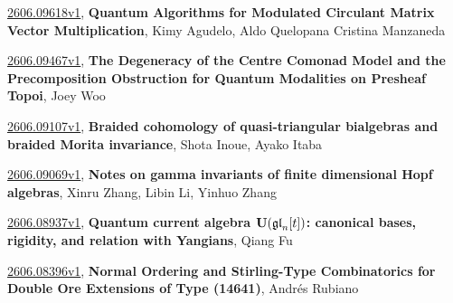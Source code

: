 \documentclass[9pt, a4paper]{article}
\theoremstyle{plain}
\theoremstyle{definition}
\theoremstyle{remark}
\newcommand{\arxiv}[3]{\href{https://arxiv.org/abs/#1}{#1}, \textbf{\textcolor{arxivblue}{#2}}, #3}
\begin{document}
\arxiv{2606.09618v1}{Quantum Algorithms for Modulated Circulant Matrix Vector Multiplication}{Kimy Agudelo, Aldo Quelopana Cristina Manzaneda}

\arxiv{2606.09467v1}{The Degeneracy of the Centre Comonad Model and the Precomposition Obstruction for Quantum Modalities on Presheaf Topoi}{Joey Woo}

\arxiv{2606.09107v1}{Braided cohomology of quasi-triangular bialgebras and braided Morita invariance}{Shota Inoue, Ayako Itaba}

\arxiv{2606.09069v1}{Notes on gamma invariants of finite dimensional Hopf algebras}{Xinru Zhang, Libin Li, Yinhuo Zhang}

\arxiv{2606.08937v1}{Quantum current algebra ${\bf U}(\frak{gl}_n[t])$: canonical bases, rigidity, and relation with Yangians}{Qiang Fu}

\arxiv{2606.08396v1}{Normal Ordering and Stirling-Type Combinatorics for Double Ore Extensions of Type (14641)}{Andrés Rubiano}

\end{document}
